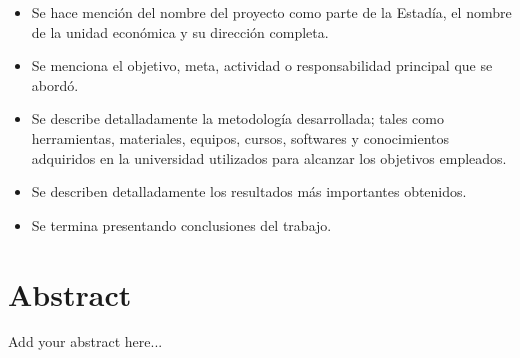 \documentclass[12pt]{article}
\begin{document}
\begin{itemize}
\item Se hace mención del nombre del proyecto como parte de la Estadía, el nombre de la unidad económica y su dirección completa.
\item Se menciona el objetivo, meta, actividad o responsabilidad principal que se abordó.
\item Se describe detalladamente la metodología desarrollada; tales como herramientas, materiales, equipos, cursos, softwares y conocimientos adquiridos en la universidad utilizados para alcanzar los objetivos empleados.
\item Se describen detalladamente los resultados más importantes obtenidos.
\item Se termina presentando conclusiones del trabajo.
\end{itemize}

\clearpage
\thispagestyle{fancy}
\section*{Abstract}
Add your abstract here...

\clearpage
\thispagestyle{empty}
\ClearWallPaper
\tableofcontents

\clearpage
{}
\setcounter{page}{1}
\pagestyle{fancy}



\clearpage


\clearpage


\clearpage


\clearpage
{}
\printbibliography

\clearpage
{}

\thispagestyle{fancy}


\clearpage
\thispagestyle{fancy}


\clearpage
\thispagestyle{fancy}


\clearpage
\thispagestyle{fancy}


\clearpage
\newcommand{\SizeFont}{\footnotesize}
\end{document}
